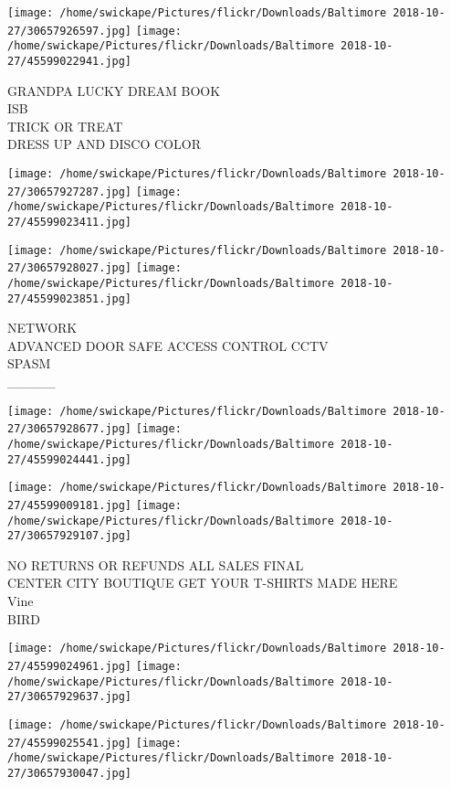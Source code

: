 \documentclass[10pt,letterpaper]{article}
\begin{document}
\texttt{[image: /home/swickape/Pictures/flickr/Downloads/Baltimore 2018-10-27/30657926597.jpg]}
\texttt{[image: /home/swickape/Pictures/flickr/Downloads/Baltimore 2018-10-27/45599022941.jpg]}

GRANDPA LUCKY DREAM BOOK\\
ISB\\
TRICK OR TREAT\\
DRESS UP AND DISCO COLOR\\
\pagebreak

\texttt{[image: /home/swickape/Pictures/flickr/Downloads/Baltimore 2018-10-27/30657927287.jpg]}
\texttt{[image: /home/swickape/Pictures/flickr/Downloads/Baltimore 2018-10-27/45599023411.jpg]}

\texttt{[image: /home/swickape/Pictures/flickr/Downloads/Baltimore 2018-10-27/30657928027.jpg]}
\texttt{[image: /home/swickape/Pictures/flickr/Downloads/Baltimore 2018-10-27/45599023851.jpg]}

NETWORK\\
ADVANCED DOOR SAFE ACCESS CONTROL CCTV\\
SPASM\\
\_\_\_\_\_\\
\pagebreak

\texttt{[image: /home/swickape/Pictures/flickr/Downloads/Baltimore 2018-10-27/30657928677.jpg]}
\texttt{[image: /home/swickape/Pictures/flickr/Downloads/Baltimore 2018-10-27/45599024441.jpg]}

\texttt{[image: /home/swickape/Pictures/flickr/Downloads/Baltimore 2018-10-27/45599009181.jpg]}
\texttt{[image: /home/swickape/Pictures/flickr/Downloads/Baltimore 2018-10-27/30657929107.jpg]}

NO RETURNS OR REFUNDS ALL SALES FINAL\\
CENTER CITY BOUTIQUE GET YOUR T{-}SHIRTS MADE HERE\\
Vine\\
BIRD\\
\pagebreak

\texttt{[image: /home/swickape/Pictures/flickr/Downloads/Baltimore 2018-10-27/45599024961.jpg]}
\texttt{[image: /home/swickape/Pictures/flickr/Downloads/Baltimore 2018-10-27/30657929637.jpg]}

\texttt{[image: /home/swickape/Pictures/flickr/Downloads/Baltimore 2018-10-27/45599025541.jpg]}
\texttt{[image: /home/swickape/Pictures/flickr/Downloads/Baltimore 2018-10-27/30657930047.jpg]}
\end{document}
